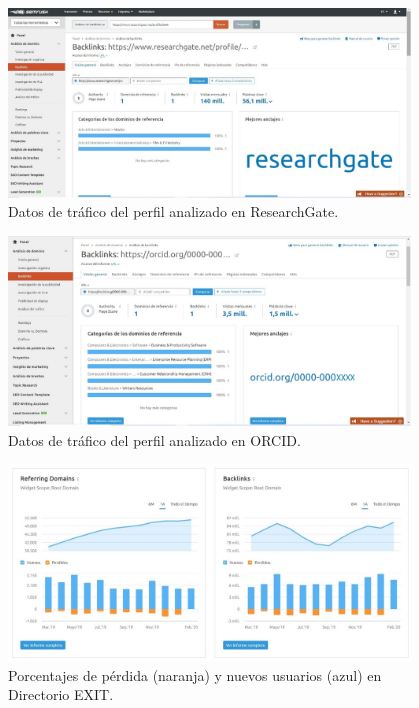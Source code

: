 \documentclass{textolivre}
\begin{document}
\begin{figure}[htbp]
 \centering
 \includegraphics[width=0.95\textwidth]{Fig01.png}
 \caption{Datos de tráfico del perfil analizado en ResearchGate.}
 \label{Fig01}
\end{figure}

\begin{figure}[htbp]
 \centering
 \includegraphics[width=0.95\textwidth]{Fig02.png}
 \caption{Datos de tráfico del perfil analizado en ORCID.}
 \label{Fig02}
\end{figure}

\begin{figure}[htbp]
 \centering
 \includegraphics[width=0.95\textwidth]{Fig03.png}
 \caption{Porcentajes de pérdida (naranja) y nuevos usuarios (azul) en Directorio EXIT.}
 \label{Fig03}
\end{figure}
\end{document}
